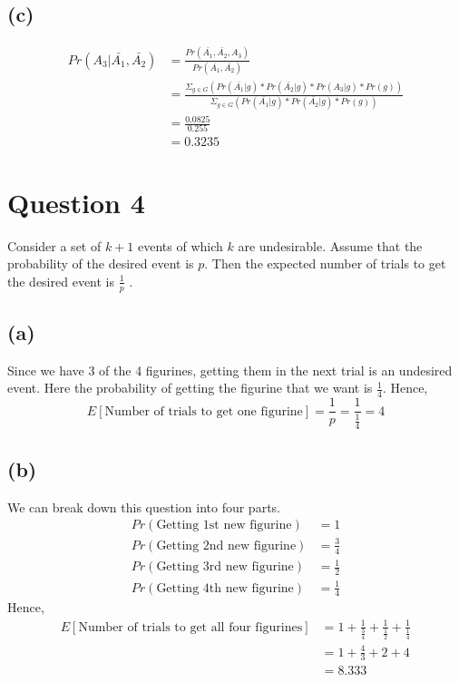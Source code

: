 \documentclass[11pt]{article}
\begin{document}
\subsection*{(c)}
\begin{equation*}
\begin{split}
Pr(A_3|\bar{A_1},\bar{A_2}) &=\frac{Pr(\bar{A_1},\bar{A_2},A_3)}{Pr(\bar{A_1},\bar{A_2})}\\
&= \frac{\Sigma_{g\in G} \left(Pr(\bar{A_1}|g)*Pr(\bar{A_2}|g)*Pr(A_3|g)*Pr(g)\right)}{\Sigma_{g\in G}\left(Pr(\bar{A_1}|g)*Pr(\bar{A_2}|g)*Pr(g)\right)}\\
&= \frac{0.0825}{0.255}\\
&= 0.3235
\end{split}
\end{equation*}
\section*{Question 4}
Consider a set of $k+1$ events of which $k$ are undesirable. Assume that the probability of the desired event is $p$. Then the expected number of trials to get the desired event is $\frac{1}{p}$ \cite{trial}.
\subsection*{(a)}
Since we have 3 of the 4 figurines, getting them in the next trial is an undesired event. Here the probability of getting the figurine that we want is $\frac{1}{4}$. Hence,
\begin{equation*}
E[\text{Number of trials to get one figurine}] = \frac{1}{p} = \frac{1}{\frac{1}{4}} = 4
\end{equation*}
\subsection*{(b)}
We can break down this question into four parts.
\begin{equation*}
\begin{split}
Pr(\text{Getting 1st new figurine}) &= 1\\
Pr(\text{Getting 2nd new figurine}) &= \frac{3}{4}\\
Pr(\text{Getting 3rd new figurine}) &= \frac{1}{2}\\
Pr(\text{Getting 4th new figurine}) &= \frac{1}{4}
\end{split}
\end{equation*}
Hence,
\begin{equation*}
\begin{split}
E[\text{Number of trials to get all four figurines}] &= 1 + \frac{1}{\frac{3}{4}} + \frac{1}{\frac{1}{2}} + \frac{1}{\frac{1}{4}}\\
&= 1 + \frac{4}{3} + 2 + 4\\
&=8.333
\end{split}
\end{equation*}
\end{document}
